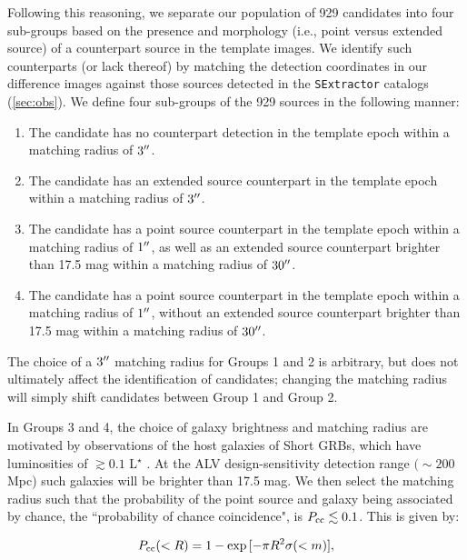 Following this reasoning, we separate our population of 929 candidates into four sub-groups based on the presence and morphology (i.e., point versus extended source) of a counterpart source in the template images. We identify such counterparts (or lack thereof) by matching the detection coordinates in our difference images against those sources detected in the {\tt SExtractor} catalogs (\autoref{sec:obs}). We define four sub-groups of the 929 sources in the following manner:

\begin{enumerate}
\item The candidate has no counterpart detection in the template epoch within a matching radius of $3\hbox{$^{\prime\prime}$}$. 

\item The candidate has an extended source counterpart in the template epoch within a matching radius of $3 \hbox{$^{\prime\prime}$}$. 

\item The candidate has a point source counterpart in the template epoch within a matching radius of $1\hbox{$^{\prime\prime}$}$, as well as an extended source counterpart brighter than 17.5 mag within a matching radius of $30\hbox{$^{\prime\prime}$}$. 

\item The candidate has a point source counterpart in the template epoch within a matching radius of $1\hbox{$^{\prime\prime}$}$, without an extended source counterpart brighter than 17.5 mag  within a matching radius of $30\hbox{$^{\prime\prime}$}$. 
\end{enumerate}

The choice of a $3\hbox{$^{\prime\prime}$}$ matching radius for Groups 1 and 2 is arbitrary, but does not ultimately affect the identification of candidates; changing the matching radius will simply shift candidates between Group 1 and Group 2. 

In Groups 3 and 4, the choice of galaxy brightness and matching radius are motivated by observations of the host galaxies of Short GRBs, which have luminosities of $\gtrsim 0.1$ L$^\star$ \citep{fong13,fong+13,berger14}. At the ALV design-sensitivity detection range $(\sim 200$ Mpc) such galaxies will be brighter than 17.5 mag. We then select the matching radius such that the probability of the point source and galaxy being associated by chance, the ``probability of chance coincidence", is $P_{\rm cc}\lesssim 0.1$. This is given by:

\begin{equation}
P_{\rm cc}(<R) = 1 - \exp{[-\pi R^2 \sigma(<m)]},
\end{equation}

